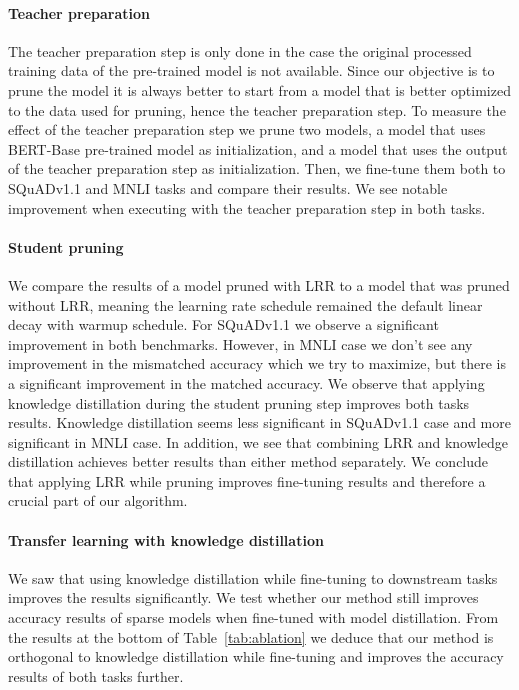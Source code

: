 \documentclass{article}
\begin{document}
\paragraph{Teacher preparation}
The teacher preparation step is only done in the case the original processed training data of the pre-trained model is not available.
Since our objective is to prune the model it is always better to start from a model that is better optimized to the data used for pruning, hence the teacher preparation step.
To measure the effect of the teacher preparation step we prune two models, a model that uses BERT-Base pre-trained model as initialization, and a model that uses the output of the teacher preparation step as initialization.
Then, we fine-tune them both to SQuADv1.1 and MNLI tasks and compare their results.
We see notable improvement when executing with the teacher preparation step in both tasks.

\paragraph{Student pruning}
We compare the results of a model pruned with LRR to a model that was pruned without LRR, meaning the learning rate schedule remained the default linear decay with warmup schedule.
For SQuADv1.1 we observe a significant improvement in both benchmarks.
However, in MNLI case we don't see any improvement in the mismatched accuracy which we try to maximize, but there is a significant improvement in the matched accuracy.
We observe that applying knowledge distillation during the student pruning step improves both tasks results.
Knowledge distillation seems less significant in SQuADv1.1 case and more significant in MNLI case.
In addition, we see that combining LRR and knowledge distillation achieves better results than either method separately.
We conclude that applying LRR while pruning improves fine-tuning results and therefore a crucial part of our algorithm.

\paragraph{Transfer learning with knowledge distillation}
We saw that using knowledge distillation while fine-tuning to downstream tasks improves the results significantly.
We test whether our method still improves accuracy results of sparse models when fine-tuned with model distillation.
From the results at the bottom of Table~\ref{tab:ablation} we deduce that our method is orthogonal to knowledge distillation while fine-tuning and improves the accuracy results of both tasks further.
\end{document}

